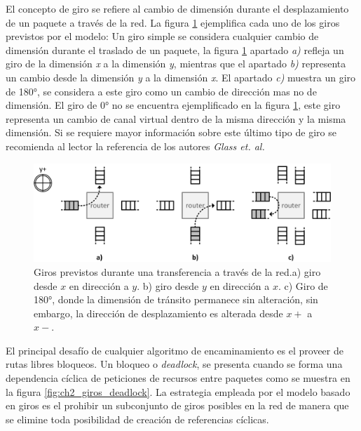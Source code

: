El concepto de giro se refiere al cambio de dimensión durante el desplazamiento de un paquete a través de la red. La figura \ref{fig:ch2_turns} ejemplifica cada uno de los giros previstos por el modelo: Un giro simple se considera cualquier cambio de dimensión durante el traslado de un paquete, la figura \ref{fig:ch2_turns} apartado \textit{a)} refleja un giro de la dimensión \textit{x} a la dimensión \textit{y}, mientras que el apartado \textit{b)} representa un cambio desde la dimensión \textit{y} a la dimensión \textit{x}. El apartado \textit{c)} muestra un giro de 180°, se considera a este giro como un cambio de dirección mas no de dimensión. El giro de 0° no se encuentra ejemplificado en la figura \ref{fig:ch2_turns}, este giro representa un cambio de canal virtual dentro de la misma dirección y la misma dimensión. Si se requiere mayor información sobre este último tipo de giro se recomienda al lector la referencia de los autores \textit{Glass et. al.}

\begin{figure}
	\begin{center}
		\includegraphics[scale=0.7]{figures/ch2_turns.png}
	\end{center}
	\caption
		{	
			Giros previstos durante una transferencia a través de la red.a) giro desde $x$ en dirección a $y$. b) giro desde $y$ en dirección a $x$. c) Giro de 180°, donde la dimensión de tránsito permanece sin alteración, sin embargo, la dirección de desplazamiento es alterada desde $x+$ a $x-$.
		}
	\label{fig:ch2_turns}
\end{figure}

El principal desafío de cualquier algoritmo de encaminamiento es el proveer de rutas libres bloqueos. Un bloqueo o \textit{deadlock}, se presenta cuando se forma una dependencia cíclica de peticiones de recursos entre paquetes como se muestra en la figura \ref{fig:ch2_giros_deadlock}. La estrategia empleada por el modelo basado en giros es el prohibir un subconjunto de giros posibles en la red de manera que se elimine toda posibilidad de creación de referencias cíclicas.

